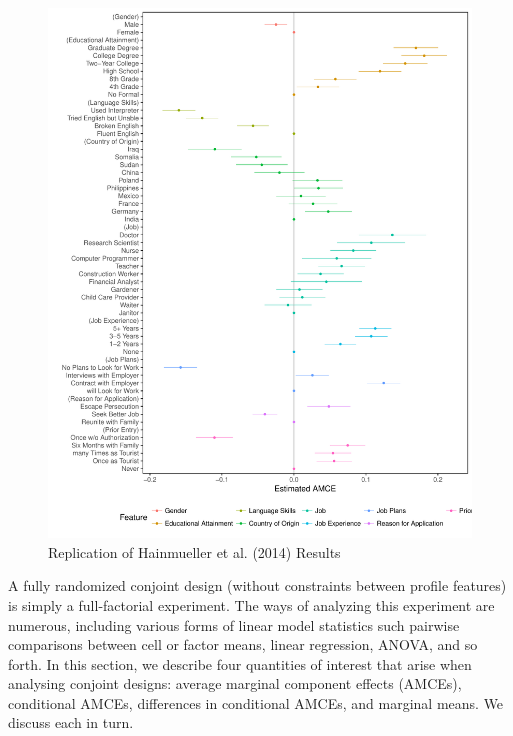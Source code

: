 \documentclass[a4paper,12pt]{article}\usepackage[]{graphicx}\usepackage[]{color}
\makeatletter
\def\maxwidth{ %
  \ifdim\Gin@nat@width>\linewidth
    \linewidth
  \else
    \Gin@nat@width
  \fi
}
\newenvironment{kframe}{%
 \def\at@end@of@kframe{}%
 \ifinner\ifhmode%
  \def\at@end@of@kframe{\end{minipage}}%
  \begin{minipage}{\columnwidth}%
 \fi\fi%
 \def\FrameCommand##1{\hskip\@totalleftmargin \hskip-\fboxsep
 \colorbox{shadecolor}{##1}\hskip-\fboxsep
     \hskip-\linewidth \hskip-\@totalleftmargin \hskip\columnwidth}%
 \MakeFramed {\advance\hsize-\width
   \@totalleftmargin\z@ \linewidth\hsize
   \@setminipage}}%
 {\par\unskip\endMakeFramed%
 \at@end@of@kframe}
\newenvironment{knitrout}{}{} %
\makeatother
\begin{document}
\begin{knitrout}
\color{fgcolor}\begin{kframe}


{\ttfamily\noindent\itshape\color{messagecolor}{\#\# Loading required namespace: ggstance}}\end{kframe}\begin{figure}
\includegraphics[width=\maxwidth]{figure/hainmueller_immigration-1} \caption[Replication of Hainmueller et al]{Replication of Hainmueller et al. (2014) Results}\label{fig:hainmueller_immigration}
\end{figure}


\end{knitrout}

A fully randomized conjoint design (without constraints between profile features) is simply a full-factorial experiment. The ways of analyzing this experiment are numerous, including various forms of linear model statistics such pairwise comparisons between cell or factor means, linear regression, ANOVA, and so forth. In this section, we describe four quantities of interest that arise when analysing conjoint designs: average marginal component effects (AMCEs), conditional AMCEs, differences in conditional AMCEs, and marginal means. We discuss each in turn.
\end{document}
